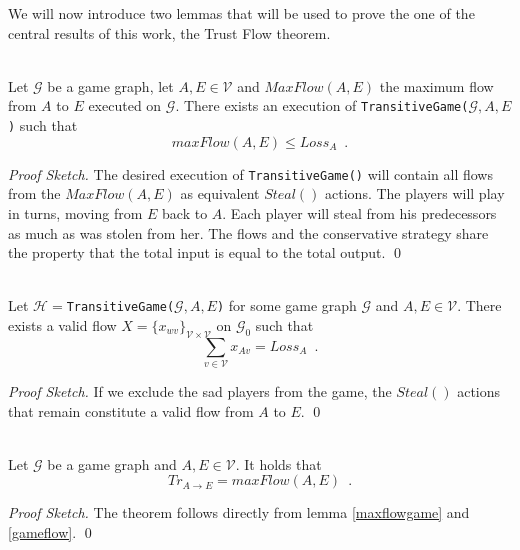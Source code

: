 \documentclass[11pt]{llncs}
\theoremstyle{definition}
\newenvironment{proofsketch}{\textit{Proof Sketch.}}{\qed \smallskip \ \\}
\begin{document}
    We will now introduce two lemmas that will be used to prove the one of the central results of this work, the Trust Flow
    theorem.
    \begin{lemma} \ \\
       \label{maxflowgame}
       Let $\mathcal{G}$ be a game graph, let $A, E \in \mathcal{V}$ and $MaxFlow\left(A, E\right)$ the maximum flow from
       $A$ to $E$ executed on $\mathcal{G}$. There exists an execution of
       \texttt{TransitiveGame(}$\mathcal{G}, A, E$\texttt{)} such that
       \begin{equation*}
          maxFlow\left(A, E\right) \leq Loss_A \enspace.
       \end{equation*}
    \end{lemma}
    \begin{proofsketch}
       The desired execution of \texttt{TransitiveGame()} will contain all flows from the $MaxFlow\left(A, E\right)$ as
       equivalent $Steal\left(\right)$ actions. The players will play in turns, moving from $E$ back to $A$. Each player will
       steal from his predecessors as much as was stolen from her. The flows and the conservative strategy share the property
       that the total input is equal to the total output.
    \end{proofsketch}
    \begin{lemma} \ \\
       \label{gameflow}
       Let $\mathcal{H} = $\texttt{TransitiveGame(}$\mathcal{G}, A, E$\texttt{)} for some game graph $\mathcal{G}$ and $A,
       E \in \mathcal{V}$. There exists a valid flow
       $X = \{x_{wv}\}_{\mathcal{V} \times \mathcal{V}}$ on $\mathcal{G}_0$ such that
       \begin{equation*}
          \sum\limits_{v \in \mathcal{V}}x_{Av} = Loss_A \enspace.
       \end{equation*}
    \end{lemma}
    \begin{proofsketch}
       If we exclude the sad players from the game, the $Steal\left(\right)$ actions that remain constitute a valid flow from
       $A$ to $E$.
    \end{proofsketch}
    \begin{theorem} \ \\
       \label{trustflow}
       Let $\mathcal{G}$ be a game graph and $A, E \in \mathcal{V}$. It holds that
       \begin{equation*}
          Tr_{A \rightarrow E} = maxFlow\left(A, E\right) \enspace.
       \end{equation*}
    \end{theorem}
    \begin{proofsketch}
       The theorem follows directly from lemma \ref{maxflowgame} and \ref{gameflow}.
    \end{proofsketch}
\end{document}
